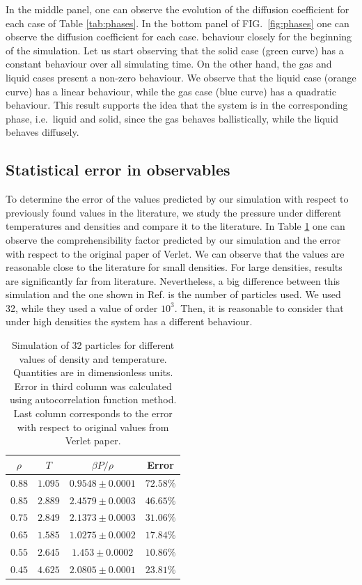 \documentclass[pra,aps,superscriptaddress,amssymb,amsmath,reprint,noeprint,floatfix]{revtex4-2}
\begin{document}
In the middle panel, one can observe the evolution of the diffusion coefficient for each case of Table \ref{tab:phases}. In the bottom panel of FIG.\ \ref{fig:phases} one can observe the diffusion coefficient for each case.  behaviour closely for the beginning of the simulation. Let us start observing that the solid case (green curve) has a constant behaviour over all simulating time. On the other hand, the gas and liquid cases present a non-zero behaviour. We observe that the liquid case (orange curve) has a linear behaviour, while the gas case (blue curve) has a quadratic behaviour. This result supports the idea that the system is in the corresponding phase, i.e.\ liquid and solid, since the gas behaves ballistically, while the liquid behaves diffusely.


\subsection{Statistical error in observables}
To determine the error of the values predicted by our simulation with respect to previously found values in the literature, we study the pressure under different temperatures and densities and compare it to the literature. In Table \ref{tab:pressure} one can observe the comprehensibility factor predicted by our simulation and the error with respect to the original paper of Verlet. We can observe that the values are reasonable close to the literature for small densities. For large densities, results are significantly far from literature. Nevertheless, a big difference between this simulation and the one shown in Ref.\cite{PhysRev.159.98} is the number of particles used. We used 32, while they used a value of order $10^3$. Then, it is reasonable to consider that under high densities the system has a different behaviour. 
\begin{table}[h]
\begin{tabular}{| c | c | c | c |}
\hline  $\rho$ &$T$ & $\beta P/\rho$ & Error \\
\hline $0.88$ & $1.095$ & $0.9548\pm 0.0001$ & $72.58\%$\\
\hline $0.85$ & $2.889$ & $2.4579\pm0.0003$ & $46.65\%$\\
\hline $0.75$ & $2.849$ & $2.1373\pm0.0003$ & $31.06\%$\\
\hline $0.65$ & $1.585$ & $1.0275\pm0.0002$ & $17.84\%$\\
\hline $0.55$ & $2.645$ & $1.453\pm0.0002$ & $10.86\%$\\
\hline $0.45$ & $4.625$ & $2.0805\pm0.0001$ & $23.81\%$\\
\hline
\end{tabular}
\caption{\label{tab:pressure}Simulation of 32 particles for different values of density and temperature. Quantities are in dimensionless units. Error in third column was calculated using autocorrelation function method.\cite{tudelftnotes} Last column corresponds to the error with respect to original values from Verlet paper\cite{PhysRev.159.98}.}
\end{table}
\end{document}
